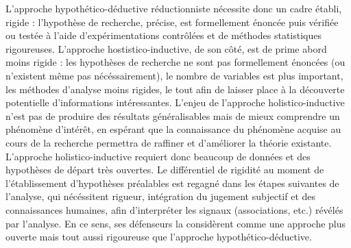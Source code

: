 \documentclass[12pt,twoside]{reedthesis}
\begin{document}
L'approche hypothético-déductive réductionniste nécessite donc un cadre établi, rigide : l'hypothèse de recherche, précise, est formellement énoncée puis vérifiée ou testée à l'aide d'expérimentations contrôlées et de méthodes statistiques rigoureuses. L'approche hostistico-inductive, de son côté, est de prime abord moins rigide : les hypothèses de recherche ne sont pas formellement énoncées (ou n'existent même pas nécéssairement), le nombre de variables est plus important, les méthodes d'analyse moins rigides, le tout afin de laisser place à la découverte potentielle d'informations intéressantes. L'enjeu de l'approche holistico-inductive n'est pas de produire des résultats généralisables mais de mieux comprendre un phénomène d'intérêt, en espérant que la connaissance du phénomène acquise au cours de la recherche permettra de raffiner et d'améliorer la théorie existante. L'approche holistico-inductive requiert donc beaucoup de données et des hypothèses de départ très ouvertes. Le différentiel de rigidité au moment de l'établissement d'hypothèses préalables est regagné dans les étapes suivantes de l'analyse, qui nécéssitent rigueur, intégration du jugement subjectif et des connaissances humaines, afin d'interpréter les signaux (associations, etc.) révélés par l'analyse. En ce sens, ses défenseurs la considèrent comme une approche plus ouverte mais tout aussi rigoureuse que l'approche hypothético-déductive.\\
\end{document}
